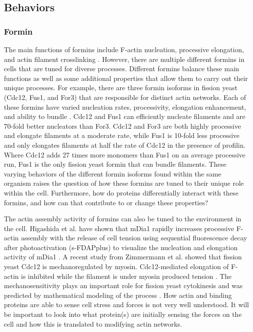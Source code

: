 \subsection{Behaviors}\label{ena-formin-behaviors}

\subsubsection{Formin}
The main functions of formins include F-actin nucleation, processive elongation, and actin filament crosslinking \citep{pollard_actin_2016}. However, there are multiple different formins in cells that are tuned for diverse processes. Different formins balance these main functions as well as some additional properties that allow them to carry out their unique processes. For example, there are three formin isoforms in fission yeast (Cdc12, Fus1, and For3) that are responsible for distinct actin networks. Each of these formins have varied nucleation rates, processivity, elongation enhancement, and ability to bundle \citep{scott_functionally_2011}. Cdc12 and Fus1 can efficiently nucleate filaments and are 70-fold better nucleators than For3. Cdc12 and For3 are both highly processive and elongate filaments at a moderate rate, while Fus1 is 10-fold less processive and only elongates filaments at half the rate of Cdc12 in the presence of profilin. Where Cdc12 adds 27 times more monomers than Fus1 on an average processive run, Fus1 is the only fission yeast formin that can bundle filaments. These varying behaviors of the different formin isoforms found within the same organism raises the question of how these formins are tuned to their unique role within the cell. Furthermore, how do proteins differentially interact with these formins, and how can that contribute to or change these properties?

The actin assembly activity of formins can also be tuned to the environment in the cell. Higashida et al. have shown that mDia1 rapidly increases processive F-actin assembly with the release of cell tension using sequential fluorescence decay after photoactivation (s-FDAPplus) to visualize the nucleation and elongation activity of mDia1 \citep{higashida_f-_2013}. A recent study from Zimmermann et al. showed that fission yeast Cdc12 is mechanoregulated by myosin. Cdc12-mediated elongation of F-actin is inhibited while the filament is under myosin produced tension \citep{zimmermann_mechanoregulated_2017}. The mechanosensitivity plays an important role for fission yeast cytokinesis and was predicted by mathematical modeling of the process \citep{vavylonis_model_2006}. How actin and binding proteins are able to sense cell stress and forces is not very well understood. It will be important to look into what protein(s) are initially sensing the forces on the cell and how this is translated to modifying actin networks. 


